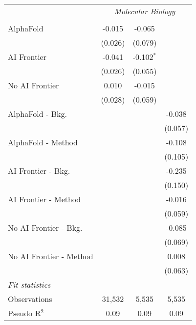 \begin{tabular}{lccc}
 & \multicolumn{3}{c}{\textit{Molecular Biology}} \\ \\
   AlphaFold               & -0.015  & -0.065       &   \\   
                           & (0.026) & (0.079)      &   \\   
   AI Frontier             & -0.041  & -0.102$^{*}$ &   \\   
                           & (0.026) & (0.055)      &   \\   
   No AI Frontier          & 0.010   & -0.015       &   \\   
                           & (0.028) & (0.059)      &   \\   
   AlphaFold - Bkg.        &         &              & -0.038\\   
                           &         &              & (0.057)\\   
   AlphaFold - Method      &         &              & -0.108\\   
                           &         &              & (0.105)\\   
   AI Frontier - Bkg.      &         &              & -0.235\\   
                           &         &              & (0.150)\\   
   AI Frontier - Method    &         &              & -0.016\\   
                           &         &              & (0.059)\\   
   No AI Frontier - Bkg.   &         &              & -0.085\\   
                           &         &              & (0.069)\\   
   No AI Frontier - Method &         &              & 0.008\\   
                           &         &              & (0.063)\\   
   \midrule
   \emph{Fit statistics}\\
   Observations            & 31,532  & 5,535        & 5,535\\  
   Pseudo R$^2$            & 0.09    & 0.09         & 0.09\\  
   

\end{tabular}
